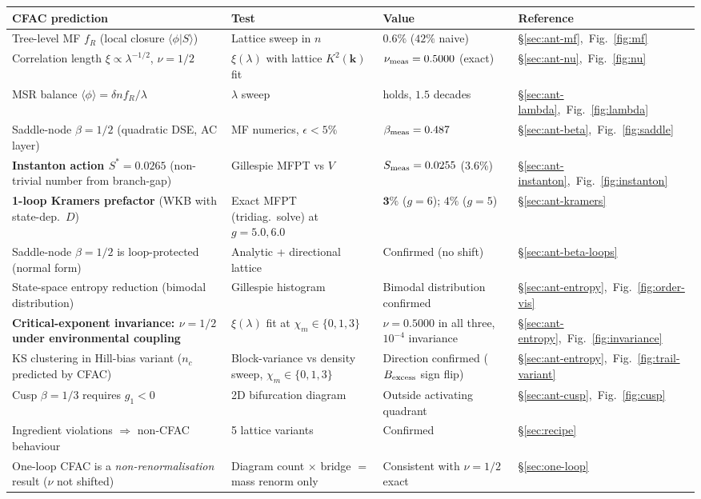 \documentclass[10pt,a4paper,twocolumn]{article}
\newcommand{\avg}[1]{\langle #1 \rangle}
\theoremstyle{definition}
\begin{document}
\begin{table}[t]
\centering
\small
\renewcommand{\arraystretch}{1.3}
\begin{tabular}{@{}p{5cm}p{4cm}p{4.5cm}p{2.8cm}@{}}
\toprule
\textbf{CFAC prediction}
  & \textbf{Test}
  & \textbf{Value}
  & \textbf{Reference} \\
\midrule
Tree-level MF $f_R$
  (local closure $\avg{\phi|S}$)
  & Lattice sweep in $n$
  & $0.6\%$ ($42\%$ naive)
  & \S\ref{sec:ant-mf},~Fig.~\ref{fig:mf} \\
Correlation length $\xi\propto\lambda^{-1/2}$, $\nu=1/2$
  & $\xi(\lambda)$ with lattice $K^2(\mathbf{k})$ fit
  & $\nu_{\rm meas}=0.5000$ (exact)
  & \S\ref{sec:ant-nu},~Fig.~\ref{fig:nu} \\
MSR balance $\avg\phi = \delta n f_R/\lambda$
  & $\lambda$ sweep
  & holds, $1.5$ decades
  & \S\ref{sec:ant-lambda},~Fig.~\ref{fig:lambda} \\
Saddle-node $\beta = 1/2$ (quadratic DSE, AC layer)
  & MF numerics, $\epsilon<5\%$
  & $\beta_{\rm meas}=0.487$
  & \S\ref{sec:ant-beta},~Fig.~\ref{fig:saddle} \\
\textbf{Instanton action $S^* = 0.0265$} (non-trivial number from branch-gap)
  & Gillespie MFPT vs $V$
  & $S_{\rm meas} = 0.0255$ (3.6\%)
  & \S\ref{sec:ant-instanton},~Fig.~\ref{fig:instanton} \\
\textbf{1-loop Kramers prefactor} (WKB with state-dep.\ $D$)
  & Exact MFPT (tridiag.\ solve) at $g=5.0, 6.0$
  & $\mathbf{3\%}$ ($g=6$); $4\%$ ($g=5$)
  & \S\ref{sec:ant-kramers} \\
Saddle-node $\beta = 1/2$ is loop-protected (normal form)
  & Analytic + directional lattice
  & Confirmed (no shift)
  & \S\ref{sec:ant-beta-loops} \\
State-space entropy reduction (bimodal distribution)
  & Gillespie histogram
  & Bimodal distribution confirmed
  & \S\ref{sec:ant-entropy},~Fig.~\ref{fig:order-vis} \\
\textbf{Critical-exponent invariance: $\nu = 1/2$ under environmental coupling}
  & $\xi(\lambda)$ fit at $\chi_m \in\{0, 1, 3\}$
  & $\nu = 0.5000$ in all three, $10^{-4}$ invariance
  & \S\ref{sec:ant-entropy},~Fig.~\ref{fig:invariance} \\
KS clustering in Hill-bias variant ($n_c$ predicted by CFAC)
  & Block-variance vs density sweep, $\chi_m \in\{0,1,3\}$
  & Direction confirmed ($B_{\rm excess}$ sign flip)
  & \S\ref{sec:ant-entropy},~Fig.~\ref{fig:trail-variant} \\
Cusp $\beta = 1/3$ requires $g_1 < 0$
  & 2D bifurcation diagram
  & Outside activating quadrant
  & \S\ref{sec:ant-cusp},~Fig.~\ref{fig:cusp} \\
Ingredient violations $\Rightarrow$ non-CFAC behaviour
  & 5 lattice variants
  & Confirmed
  & \S\ref{sec:recipe} \\
One-loop CFAC is a \emph{non-renormalisation} result ($\nu$ not shifted)
  & Diagram count $\times$ bridge $=$ mass renorm only
  & Consistent with $\nu=1/2$ exact
  & \S\ref{sec:one-loop} \\
\bottomrule
\end{tabular}
\end{table}
\end{document}
